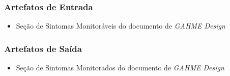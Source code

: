 \subsubsection{Artefatos de Entrada}
\begin{itemize}
	\item Seção de Sintomas Monitoráveis do documento de \textit{GAHME Design}
\end{itemize}

\subsubsection{Artefatos de Saída}
\begin{itemize}
	\item Seção de Sintomas Monitorados do documento de \textit{GAHME Design}
\end{itemize}

